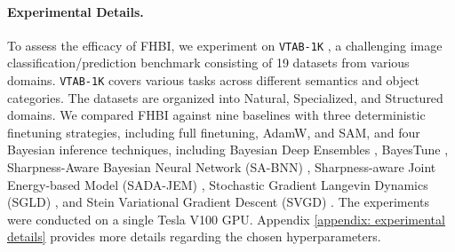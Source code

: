 \paragraph{Experimental Details.} To assess the efficacy of FHBI, we experiment on \texttt{VTAB-1K} \citep{vtab}, a challenging image classification/prediction benchmark consisting of 19 datasets from various domains. \texttt{VTAB-1K} covers various tasks across different semantics and object categories. The datasets are organized into Natural, Specialized, and Structured domains. We compared FHBI against nine baselines with three deterministic finetuning strategies, including full finetuning, AdamW, and SAM, and four Bayesian inference techniques, including Bayesian Deep Ensembles \citep{deepens}, BayesTune \citep{bayestune}, Sharpness-Aware Bayesian Neural Network (SA-BNN) \citep{va2023_flat_Bayes}, Sharpness-aware Joint Energy-based Model (SADA-JEM) \citep{sada_jem}, Stochastic Gradient Langevin Dynamics (SGLD) \citep{sgld}, and Stein Variational Gradient Descent (SVGD) \citep{svgd}. The experiments were conducted on a single Tesla V100 GPU. Appendix \ref{appendix: experimental details} provides more details regarding the chosen hyperparameters.



